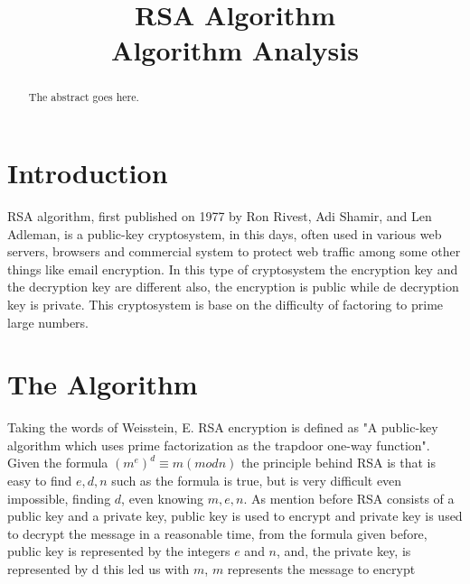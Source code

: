 \documentclass[conference,compsoc, 10pt]{IEEEtran}
\begin{document}
	

\title{RSA Algorithm\\ Algorithm Analysis}
\author{
\and
{}
\and
{}
}

\maketitle
\large
\begin{abstract}
	\large
	The abstract goes here.
\end{abstract}

\IEEEpeerreviewmaketitle

\section{Introduction}
RSA algorithm, first published on 1977 by Ron Rivest, Adi Shamir, and Len Adleman,  is a public-key cryptosystem, in this days, often used in various web servers, browsers and commercial system to protect web traffic among some other things like email encryption. In this type of cryptosystem the encryption key and the decryption key are different also, the encryption is public while de decryption key is private. This cryptosystem is base on the difficulty of factoring to prime large numbers.

\section{The Algorithm}
Taking the words of Weisstein, E. RSA encryption is defined as "A public-key algorithm which uses prime factorization as the trapdoor one-way function". Given the formula $(m^e)^d \equiv m (mod n)$ the principle behind RSA is that is easy to find $e, d, n$ such as the formula is true, but is very difficult even impossible, finding $d$, even knowing $m, e, n$. As mention before RSA consists of a public key and a private key, public key is used to encrypt and private key is used to decrypt the message in a reasonable time, from the formula given before, public key is represented by the integers $e$ and $n$, and, the private key, is represented by d this led us with $m$, $m$ represents the message to encrypt
\end{document}
